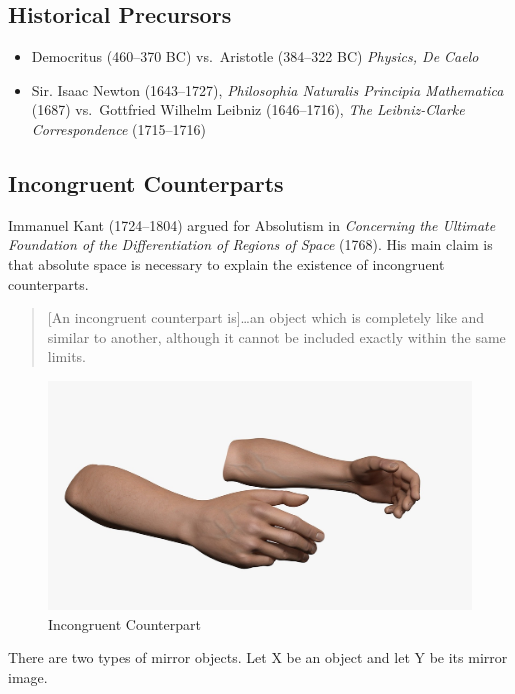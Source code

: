 \documentclass[oneside]{article}
\begin{document}
\subsection*{Historical Precursors}\label{historical-precursors}

\begin{itemize}
\item
  Democritus (460--370 BC) vs.~Aristotle (384--322 BC) \emph{Physics, De
  Caelo}
\item
  Sir. Isaac Newton (1643--1727), \emph{Philosophia Naturalis Principia
  Mathematica} (1687) vs.~Gottfried Wilhelm Leibniz (1646--1716),
  \emph{The Leibniz-Clarke Correspondence} (1715--1716)
\end{itemize}

\newpage

\subsection*{Incongruent Counterparts}\label{incongruent-counterparts}




Immanuel Kant (1724--1804) argued for Absolutism in \emph{Concerning the
Ultimate Foundation of the Differentiation of Regions of Space} (1768).
His main claim is that absolute space is necessary to explain the existence of
incongruent counterparts.



\begin{quote}
{[}An incongruent counterpart is{]}\ldots{}an object which is completely
like and similar to another, although it cannot be included exactly
within the same limits.
\end{quote}


\begin{figure}[h]
  \includegraphics[width=\linewidth]{hands.jpg}
  \caption{Incongruent Counterpart}
\end{figure}
There are two types of mirror objects. Let X be an object and let Y be
its mirror image.
\end{document}
